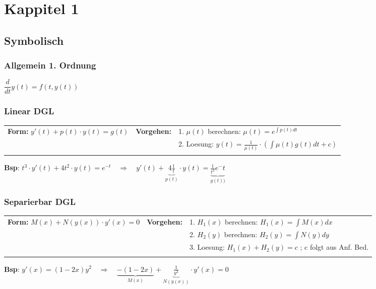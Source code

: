 \section{Kappitel 1}

\subsection{Symbolisch}

\subsubsection{Allgemein 1. Ordnung}
$\dfrac{d}{dt}y(t)=f(t,y(t))$

\subsubsection{Linear DGL}
\begin{tabular}{p{6cm}p{2cm}p{10.5cm}}
\textbf{Form:} $y'(t) + p(t) \cdot y(t) = g(t)$ &
\textbf{Vorgehen:}              &

1. $\mu(t)$ berechnen: $\mu(t) = e^{\int p(t) dt}$ \\ &&
2. Loesung: $y(t) = \frac{1}{\mu(t)} \cdot ( \int \mu(t) g(t) dt +c)$ \\ &&
\end{tabular}
\textbf{Bsp}: $t^3 \cdot y'(t) + 4 t^2 \cdot y(t) = e^{-t} \quad \Longrightarrow \quad y'(t) + \underbrace{4 \frac{1}{t}}_{p(t)} \cdot y(t) = \underbrace{\frac{1}{t^3} e^-t}_{g(t))}$

\subsubsection{Separierbar DGL}
\begin{tabular}{p{6cm}p{2cm}p{10.5cm}}
\textbf{Form:} $M(x) + N(y(x))\cdot y'(x) = 0$ &
\textbf{Vorgehen:}              &

1. $H_1(x)$ berechnen: $H_1(x) = \int M(x) dx$ \\ &&
2. $H_2(y)$ berechnen: $H_2(y) = \int N(y)dy$ \\ &&
3. Loesung: $H_1(x) + H_2(y) = c$ ; c folgt aus Anf. Bed.\\\\
\end{tabular}
\textbf{Bsp}: $y'(x) = (1-2x)y^2 \quad \Longrightarrow \quad \underbrace{-(1-2x)}_{M(x)} + \underbrace{\frac{1}{y^2}}_{N(y(x))} \cdot y'(x) = 0$

